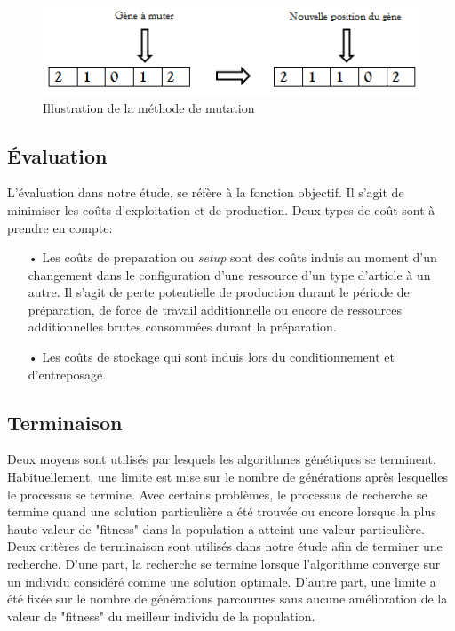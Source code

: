 \documentclass[12pt,a4paper]{article}
\begin{document}
	\begin{figure}[!h]
		\begin{center}
			\includegraphics[scale=.5]{img/mutation_fig.png}
			\caption{Illustration de la méthode de mutation}
			\label{fig:used_mutation}
		\end{center}
	\end{figure}
	
	\subsection{Évaluation}
	L'évaluation dans notre étude, se réfère à la fonction objectif. Il s'agit de minimiser les coûts d'exploitation et de production. Deux types de coût sont à prendre en compte:
	\begin{itemize}
		\item[•] Les coûts de preparation ou \emph{setup} sont des coûts induis au moment d'un changement dans le configuration d'une ressource d'un type d'article à un autre. Il s'agit de perte potentielle de production durant le période de préparation, de force de travail additionnelle ou encore de ressources additionnelles brutes consommées durant la préparation.
		\item[•] Les coûts de stockage qui sont induis lors du conditionnement et d’entreposage.
	\end{itemize}
	
	\subsection{Terminaison}
	Deux moyens sont utilisés par lesquels les algorithmes génétiques se terminent. Habituellement, une limite est mise sur le nombre de générations après lesquelles le processus se termine. Avec certains problèmes, le processus de recherche se termine quand une solution particulière a été trouvée ou encore lorsque la plus haute valeur de "fitness" dans la population a atteint une valeur particulière. \\
	\hspace*{.5cm} Deux critères de terminaison sont utilisés dans notre étude afin de terminer une recherche. D'une part, la recherche se termine lorsque l'algorithme converge sur un individu considéré comme une solution optimale. D'autre part, une limite a été fixée sur le nombre de générations parcourues sans aucune amélioration de la valeur de "fitness" du meilleur individu de la population.
	
\end{document}
